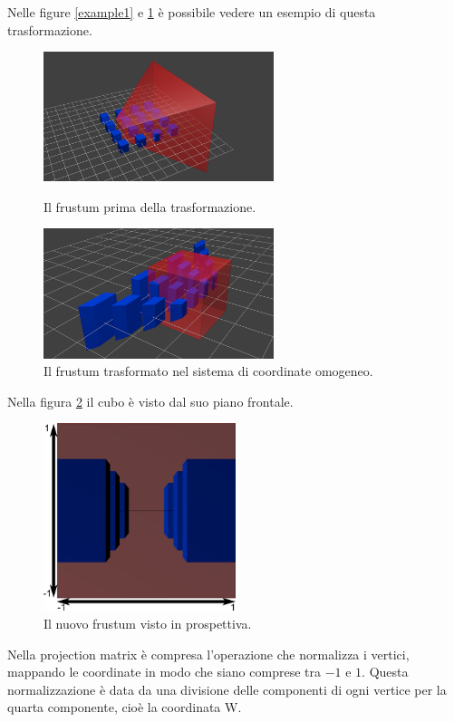 Nelle figure \ref{example1} e \ref{example2} è possibile vedere un esempio di questa trasformazione.
\begin{figure}[htbp]
\centering
\includegraphics[width=0.6\textwidth]{images/frustum/frustum_cubes.png}
\caption{Il frustum prima della trasformazione.\label{example1}}
\includegraphics[width=0.6\textwidth]{images/frustum/frustum_homogeneous.png}
\caption{Il frustum trasformato nel sistema di coordinate omogeneo.\label{example2}}
\end{figure}

Nella figura \ref{example3} il cubo è visto dal suo piano frontale.

\begin{figure}[htbp]
\centering
\includegraphics[width=0.5\textwidth]{images/frustum/frustum_view.png}
\caption{Il nuovo frustum visto in prospettiva.\label{example3}}
\end{figure}

Nella projection matrix è compresa l'operazione che normalizza i vertici, mappando le coordinate in modo che siano comprese tra $-1$ e $1$. Questa normalizzazione è data da una divisione delle componenti di ogni vertice per la quarta componente, cioè la coordinata W.


